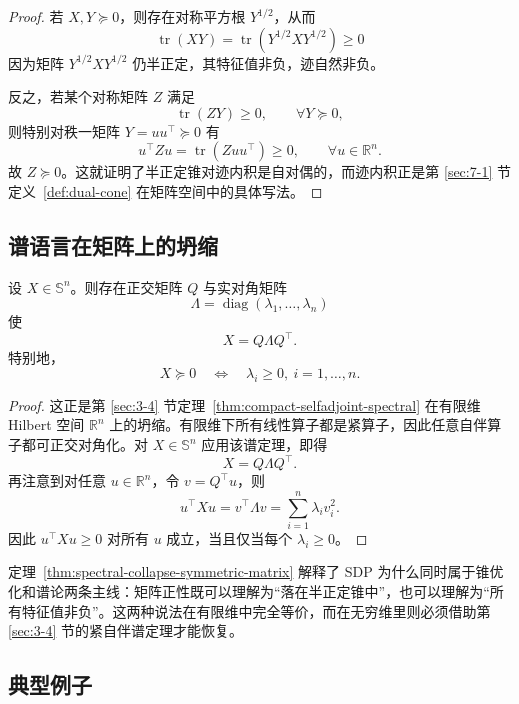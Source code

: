 \begin{proof}
若 $X,Y\succeq 0$，则存在对称平方根 $Y^{1/2}$，从而
\[
\operatorname{tr}(XY)=\operatorname{tr}(Y^{1/2}XY^{1/2})\ge 0
\]
因为矩阵 $Y^{1/2}XY^{1/2}$ 仍半正定，其特征值非负，迹自然非负。

反之，若某个对称矩阵 $Z$ 满足
\[
\operatorname{tr}(ZY)\ge 0,\qquad \forall Y\succeq 0,
\]
则特别对秩一矩阵 $Y=uu^\top\succeq 0$ 有
\[
u^\top Zu=\operatorname{tr}(Zuu^\top)\ge 0,\qquad \forall u\in \mathbb R^n.
\]
故 $Z\succeq 0$。这就证明了半正定锥对迹内积是自对偶的，而迹内积正是第 \ref{sec:7-1} 节定义~\ref{def:dual-cone} 在矩阵空间中的具体写法。
\end{proof}

\subsection{谱语言在矩阵上的坍缩}

\begin{theorem}[对称矩阵的谱分解坍缩]\label{thm:spectral-collapse-symmetric-matrix}
设 $X\in \mathbb S^n$。则存在正交矩阵 $Q$ 与实对角矩阵
\[
\Lambda=\operatorname{diag}(\lambda_1,\dots,\lambda_n)
\]
使
\[
X=Q\Lambda Q^\top.
\]
特别地，
\[
X\succeq 0
\quad\Longleftrightarrow\quad
\lambda_i\ge 0,\ i=1,\dots,n.
\]
\end{theorem}

\begin{proof}
这正是第 \ref{sec:3-4} 节定理~\ref{thm:compact-selfadjoint-spectral} 在有限维 Hilbert 空间 $\mathbb R^n$ 上的坍缩。有限维下所有线性算子都是紧算子，因此任意自伴算子都可正交对角化。对 $X\in \mathbb S^n$ 应用该谱定理，即得
\[
X=Q\Lambda Q^\top.
\]
再注意到对任意 $u\in \mathbb R^n$，令 $v=Q^\top u$，则
\[
u^\top Xu=v^\top \Lambda v=\sum_{i=1}^n \lambda_i v_i^2.
\]
因此 $u^\top Xu\ge 0$ 对所有 $u$ 成立，当且仅当每个 $\lambda_i\ge 0$。
\end{proof}

\begin{remark}
定理~\ref{thm:spectral-collapse-symmetric-matrix} 解释了 SDP 为什么同时属于锥优化和谱论两条主线：矩阵正性既可以理解为“落在半正定锥中”，也可以理解为“所有特征值非负”。这两种说法在有限维中完全等价，而在无穷维里则必须借助第 \ref{sec:3-4} 节的紧自伴谱定理才能恢复。
\end{remark}

\subsection{典型例子}

